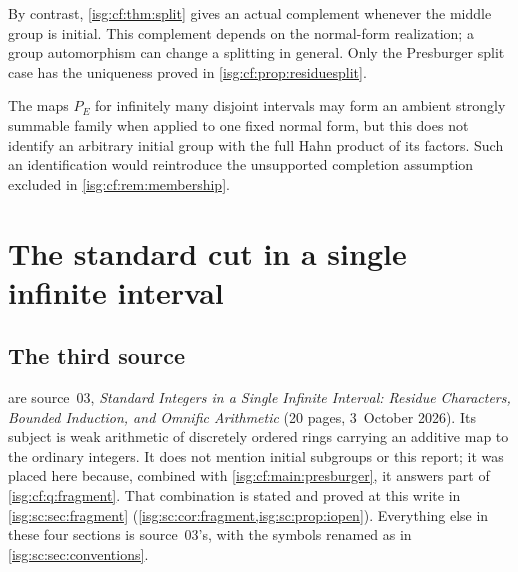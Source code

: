 \documentclass[11pt]{article}
\theoremstyle{definition}
\theoremstyle{remark}
\begin{document}
By contrast, \cref{isg:cf:thm:split} gives an actual complement whenever
the middle group is initial. This complement depends on the normal-form
realization; a group automorphism can change a splitting in general.
Only the Presburger split case has the uniqueness proved in
\cref{isg:cf:prop:residuesplit}.

The maps $P_E$ for infinitely many disjoint intervals may form an
ambient strongly summable family when applied to one fixed normal form,
but this does not identify an arbitrary initial group with the full
Hahn product of its factors. Such an identification would reintroduce
the unsupported completion assumption excluded in
\cref{isg:cf:rem:membership}.

\section{The standard cut in a single infinite interval}\label{isg:sc:sec:detector}

\subsection{The third source}\label{isg:sc:sec:overview}
are source~03, \emph{Standard Integers in a Single Infinite Interval:
Residue Characters, Bounded Induction, and Omnific Arithmetic}
(20 pages, 3~October 2026). Its subject is weak arithmetic of discretely
ordered rings carrying an additive map to the ordinary integers. It
does not mention initial subgroups or this report; it was placed here
because, combined with \cref{isg:cf:main:presburger}, it answers part of
\cref{isg:cf:q:fragment}. That combination is stated and proved at this
write in \cref{isg:sc:sec:fragment}
(\cref{isg:sc:cor:fragment,isg:sc:prop:iopen}). Everything else in these
four sections is source~03's, with the symbols renamed as in
\cref{isg:sc:sec:conventions}.
\end{document}
